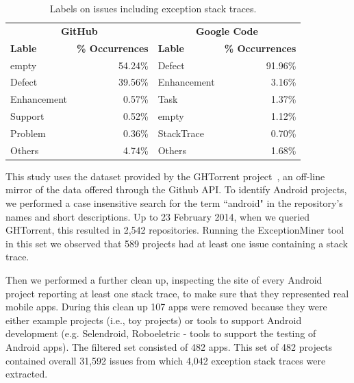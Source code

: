 \documentclass[conference]{IEEEtran}
\begin{document}
\begin{table}
  \centering
  \begin{tabular}{lr|lr}
    \hline
     \multicolumn{2}{c}{\bfseries{GitHub}} &  \multicolumn{2}{c}{\bfseries{Google Code}} \\
      \bfseries{Lable} &  \bfseries{\% Occurrences} &  \bfseries{Lable} &  \bfseries{\% Occurrences} \\
    \hline
empty &	54.24\% & Defect &	91.96\% \\
Defect &	39.56\%  & Enhancement  &	3.16\% \\
Enhancement &	0.57\% & Task	& 1.37\% \\
Support &	0.52\% & empty &	1.12\% \\
Problem &	0.36\% & StackTrace &	0.70\% \\
Others &	4.74\% &  Others &	1.68\% \\   
  \hline
  \end{tabular}
  \caption{Labels on issues including exception stack traces.}
  \label{tab:lables}
\end{table}


This study uses the dataset provided by the GHTorrent project~\cite{Gousi13}, 
an off-line mirror of the data  offered through the Github API.  
To identify Android projects, we performed a case insensitive search for the
term ``android" in the repository's names and short descriptions.  
Up to 23 February 2014,  when we queried GHTorrent, this resulted in 2,542 repositories. Running the ExceptionMiner tool 
 in this set we observed that 589 projects had at least one issue containing a stack trace.
	
Then we performed a further clean up, inspecting the site of every Android project
reporting at least one stack trace, to make sure that they represented real
mobile apps. During this clean up 107 apps were removed because they were either
example projects (i.e., toy projects) or tools to support Android development
(e.g. Selendroid, Roboeletric - tools to support the testing of Android apps).
The filtered set consisted of 482 apps. This set of 482 projects contained overall 31,592 issues from which 4,042 exception stack traces 
were extracted. 
\end{document}
